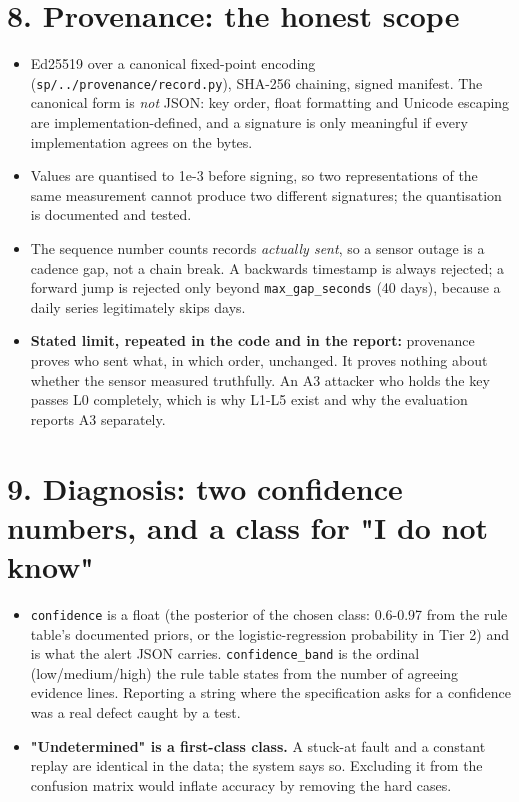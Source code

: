 \documentclass[10pt,a4paper]{article}
\begin{document}
\section*{8. Provenance: the honest scope}
\begin{itemize}
\item Ed25519 over a canonical fixed-\allowbreak{}point encoding (\texttt{sp/\allowbreak{}../\allowbreak{}provenance/\allowbreak{}record.py}),
SHA-\allowbreak{}256 chaining, signed manifest. The canonical form is \emph{not} JSON: key order, float formatting and Unicode escaping are implementation-\allowbreak{}defined, and a signature is only meaningful if every implementation agrees on the bytes.

\item Values are quantised to 1e-\allowbreak{}3 before signing, so two representations of the same
measurement cannot produce two different signatures; the quantisation is documented and tested.

\item The sequence number counts records \emph{actually sent}, so a sensor outage is a
cadence gap, not a chain break. A backwards timestamp is always rejected; a forward jump is rejected only beyond \texttt{max\_\allowbreak{}gap\_\allowbreak{}seconds} (40 days), because a daily series legitimately skips days.

\item \textbf{Stated limit, repeated in the code and in the report:} provenance proves who
sent what, in which order, unchanged. It proves nothing about whether the sensor measured truthfully. An A3 attacker who holds the key passes L0 completely, which is why L1-\allowbreak{}L5 exist and why the evaluation reports A3 separately.

\end{itemize}

\section*{9. Diagnosis: two confidence numbers, and a class for "I do not know"}
\begin{itemize}
\item \texttt{confidence} is a float (the posterior of the chosen class: 0.6-\allowbreak{}0.97 from the
rule table's documented priors, or the logistic-\allowbreak{}regression probability in Tier 2) and is what the alert JSON carries. \texttt{confidence\_\allowbreak{}band} is the ordinal (low/\allowbreak{}medium/\allowbreak{}high) the rule table states from the number of agreeing evidence lines. Reporting a string where the specification asks for a confidence was a real defect caught by a test.

\item \textbf{"Undetermined" is a first-\allowbreak{}class class.} A stuck-\allowbreak{}at fault and a constant
replay are identical in the data; the system says so. Excluding it from the confusion matrix would inflate accuracy by removing the hard cases.

\end{itemize}
\end{document}
